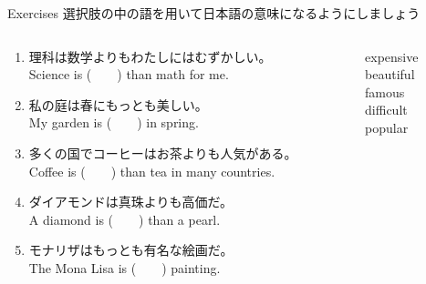 \documentclass[aspectratio=169,xcolor={dvipsnames,table}]{beamer}
\begin{document}
\begin{frame}[plain]{Exercises}
選択肢の中の語を用いて日本語の意味になるようにしましょう%
\hfill{\scriptsize {}}
\begin{columns}[t]
 \begin{column}{.75\textwidth}
   \begin{enumerate}
  \item 理科は数学よりもわたしにはむずかしい。\\
	Science is (~~~~) than math for me.
  \item 私の庭は春にもっとも美しい。\\
	My garden is (~~~~) in spring.
  \item 多くの国でコーヒーはお茶よりも人気がある。\\
	Coffee is (~~~~) than tea in many countries.
  \item ダイアモンドは真珠よりも高価だ。\\
	A diamond is (~~~~) than a pearl.
  \item モナリザはもっとも有名な絵画だ。\\
	The Mona Lisa is (~~~~) painting.
 \end{enumerate}
 \end{column}
\begin{column}{.2\textwidth}
\begin{tcolorbox}
 expensive\\
beautiful\\
famous\\
difficult\\
popular
\end{tcolorbox}
\end{column}
\end{columns}
\end{frame}
\end{document}
